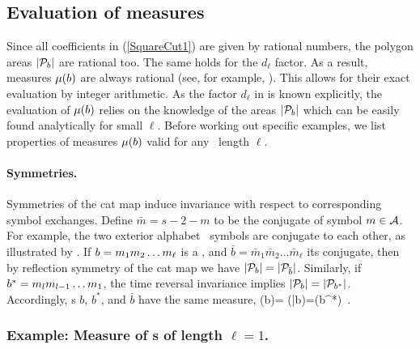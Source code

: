 \documentclass[12pt]{iopart}
\begin{document}
\subsection{Evaluation of measures}
\label{sect:catFreqEval}


Since all coefficients in  (\ref{SquareCut1})  are given by rational
numbers, the polygon areas $|\mathcal{P}_{{b}}|$ are rational too. The same
holds for the $d_\ell$ factor. As a result,   measures  ${\mu}({{b}})$ are
always rational (see, for example, ). This allows
for their exact evaluation by integer arithmetic.  As the factor $d_\ell$
in  is known explicitly, the evaluation   of
${\mu}({b})$ relies on the knowledge of the areas $|\mathcal{P}_{{b}}|$ which can
be easily found  analytically for small $\ell$. Before working out
specific examples, we list  properties of measures
${\mu}({b})$ valid for any \brick\ length $\ell$.

\paragraph{Symmetries.}
Symmetries of the cat map induce  invariance with respect to
corresponding symbol exchanges. Define $\bar{m}=s\!-\!2\!-\!m$ to be the
conjugate of symbol $m \in \mathcal{A}$. For example, the two exterior
alphabet \Ae\ symbols are conjugate to each other, as illustrated by
.
If ${b}={m_{1}} {m_{2}} \dots {\ensuremath{m_{\ell}}}$ is a
\brick, and  $\bar{{b}}=\bar{m}_1 \bar{m}_2 \dots
\bar{m}_\ell$ its conjugate, then by  reflection symmetry of the cat
map we have  $|\mathcal{P}_{{b}}|= |\mathcal{P}_{\bar{{b}}}|$. Similarly, if
$b^*={m_{l}}{m_{l-1}}\dots {\ensuremath{m_{1}}}$, the time reversal invariance implies
$|\mathcal{P}_{{b}}|=|\mathcal{P}_{{b}^*}|$. Accordingly,
\brick s $ {b}$, $ {b}^*$, and $\bar{{b}}$ have the same
measure,
 \beq
 \Msr({{b}})= \Msr({\bar{{b}}})=\Msr({{b}^*})
 \,.



\subsubsection{Example: Measure of \brick s of length $\ell=1$.}
\end{document}
